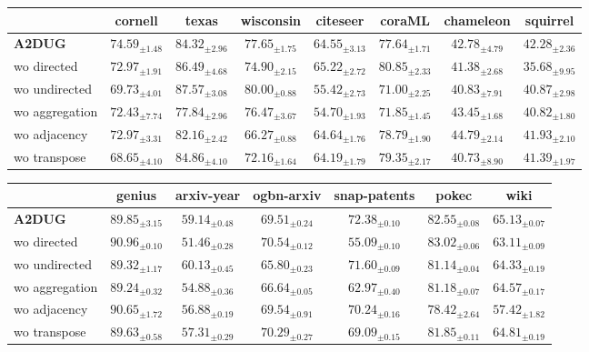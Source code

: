 \begin{table*}[t]
    \caption{Ablation study of A2DUG.
    We highlight the best score on each dataset. 
    }
    \centering

\begin{tabular}{l|ccccccc}
\toprule
 & cornell & texas & wisconsin & citeseer & coraML & chameleon & squirrel \\
\midrule
\textbf{A2DUG} & \colorbox{mycolor}{$74.59_{\pm1.48}$} & $84.32_{\pm2.96}$ & $77.65_{\pm1.75}$ & $64.55_{\pm3.13}$ & $77.64_{\pm1.71}$ & $42.78_{\pm4.79}$ & \colorbox{mycolor}{$42.28_{\pm2.36}$} \\\midrule
wo directed & $72.97_{\pm1.91}$ & $86.49_{\pm4.68}$ & $74.90_{\pm2.15}$ & \colorbox{mycolor}{$65.22_{\pm2.72}$} & \colorbox{mycolor}{$80.85_{\pm2.33}$} & $41.38_{\pm2.68}$ & $35.68_{\pm9.95}$ \\
wo undirected & $69.73_{\pm4.01}$ & \colorbox{mycolor}{$87.57_{\pm3.08}$} & \colorbox{mycolor}{$80.00_{\pm0.88}$} & $55.42_{\pm2.73}$ & $71.00_{\pm2.25}$ & $40.83_{\pm7.91}$ & $40.87_{\pm2.98}$ \\
wo aggregation & $72.43_{\pm7.74}$ & $77.84_{\pm2.96}$ & $76.47_{\pm3.67}$ & $54.70_{\pm1.93}$ & $71.85_{\pm1.45}$ & $43.45_{\pm1.68}$ & $40.82_{\pm1.80}$ \\
wo adjacency & $72.97_{\pm3.31}$ & $82.16_{\pm2.42}$ & $66.27_{\pm0.88}$ & $64.64_{\pm1.76}$ & $78.79_{\pm1.90}$ & \colorbox{mycolor}{$44.79_{\pm2.14}$} & $41.93_{\pm2.10}$ \\
wo transpose & $68.65_{\pm4.10}$ & $84.86_{\pm4.10}$ & $72.16_{\pm1.64}$ & $64.19_{\pm1.79}$ & $79.35_{\pm2.17}$ & $40.73_{\pm8.90}$ & $41.39_{\pm1.97}$ \\
\bottomrule
\end{tabular}

\vspace{3mm}
    

\begin{tabular}{l|ccc|ccc}
\toprule
{}&genius&arxiv-year&ogbn-arxiv&snap-patents&pokec&wiki\\
\midrule
\textbf{\textsc{A2DUG}}&$89.85_{\pm3.15}$&$59.14_{\pm0.48}$&$69.51_{\pm0.24}$&\colorbox{mycolor}{$ 72.38_{\pm0.10}$}&$82.55_{\pm0.08}$&\colorbox{mycolor}{$65.13_{\pm0.07}$}\\ \midrule
wo directed&\colorbox{mycolor}{$90.96_{\pm0.10}$}&$51.46_{\pm0.28}$&\colorbox{mycolor}{$70.54_{\pm0.12}$}&$55.09_{\pm0.10}$&\colorbox{mycolor}{$83.02_{\pm0.06}$}&$63.11_{\pm0.09}$\\
wo undirected&$89.32_{\pm1.17}$&\colorbox{mycolor}{$60.13_{\pm0.45}$}&$65.80_{\pm0.23}$&$71.60_{\pm0.09}$&$81.14_{\pm0.04}$&$64.33_{\pm0.19}$\\
wo aggregation&$89.24_{\pm0.32}$&$54.88_{\pm0.36}$&$66.64_{\pm0.05}$&$62.97_{\pm0.40}$&$81.18_{\pm0.07}$&$64.57_{\pm0.17}$\\
wo adjacency&$90.65_{\pm1.72}$&$56.88_{\pm0.19}$&$69.54_{\pm0.91}$&$70.24_{\pm0.16}$&$78.42_{\pm2.64}$&$57.42_{\pm1.82}$\\
wo transpose&$89.63_{\pm0.58}$&$57.31_{\pm0.29}$&$70.29_{\pm0.27}$&$69.09_{\pm0.15}$&$81.85_{\pm0.11}$&$64.81_{\pm0.19}$\\
\bottomrule
\end{tabular}
\label{tb:ablation}
\end{table*} 
